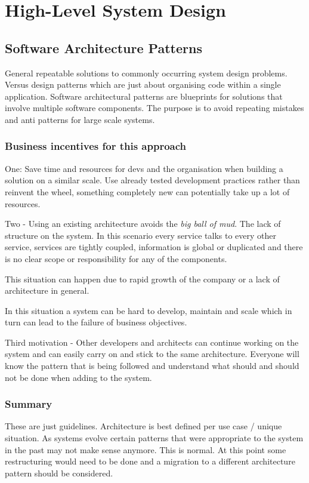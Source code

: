 \chapter{High-Level System Design}


\section{Software Architecture Patterns}
General repeatable solutions to commonly occurring system design problems.
Versus design patterns which are just about organising code within a single application.
Software architectural patterns are blueprints for solutions that involve multiple software components.
The purpose is to avoid repeating mistakes and anti patterns for large scale systems.

\subsection{Business incentives for this approach}
One: Save time and resources for devs and the organisation when building a solution on a similar scale.
Use already tested development practices rather than reinvent the wheel, something completely new can potentially take up a lot of resources.

Two - Using an existing architecture avoids the \textit{big ball of mud}.
The lack of structure on the system.
In this scenario every service talks to every other service, services are tightly coupled, information is global or duplicated and there is no clear scope or responsibility for any of the components.

This situation can happen due to rapid growth of the company or a lack of architecture in general.

In this situation a system can be hard to develop, maintain and scale which in turn can lead to the failure of business objectives.

Third motivation - Other developers and architects can continue working on the system and can easily carry on and stick to the same architecture.
Everyone will know the pattern that is being followed and understand what should and should not be done when adding to the system.

\subsection{Summary}
These are just guidelines.
Architecture is best defined per use case / unique situation.
As systems evolve certain patterns that were appropriate to the system in the past may not make sense anymore.
This is normal.
At this point some restructuring would need to be done and a migration to a different architecture pattern should be considered.

